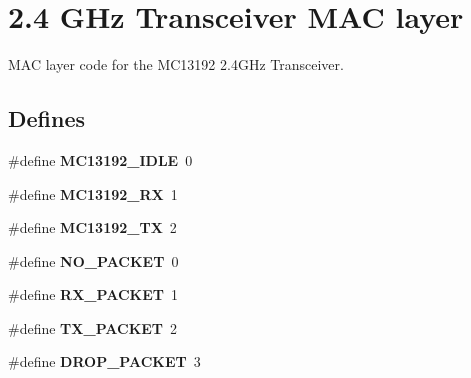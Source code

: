 \section{2.4 GHz Transceiver MAC layer}
\label{group__ro__transceiver__mac}
MAC layer code for the MC13192 2.4GHz Transceiver.  
\subsection*{Defines}
\begin{CompactItemize}
\item 
\#define {\bf MC13192\_\-IDLE}~0
\item 
\#define {\bf MC13192\_\-RX}~1
\item 
\#define {\bf MC13192\_\-TX}~2
\item 
\#define {\bf NO\_\-PACKET}~0
\item 
\#define {\bf RX\_\-PACKET}~1
\item 
\#define {\bf TX\_\-PACKET}~2
\item 
\#define {\bf DROP\_\-PACKET}~3
\end{CompactItemize}
